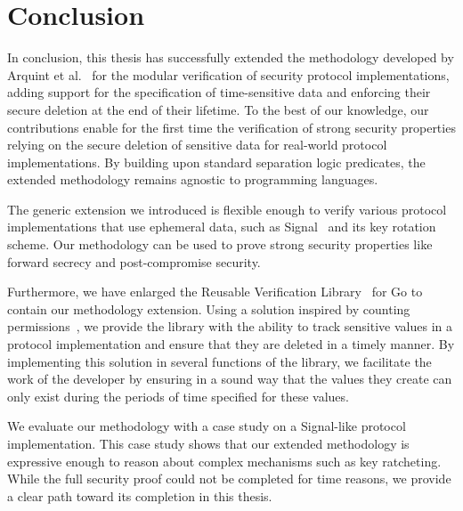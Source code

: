 \chapter{Conclusion}
\label{chap:conclusion}

In conclusion, this thesis has successfully extended the methodology developed by Arquint et al.~\cite{ArquintSchwerhoffMehtaMueller23} for the modular verification of security protocol implementations, adding support for the specification of time-sensitive data and enforcing their secure deletion at the end of their lifetime.
To the best of our knowledge, our contributions enable for the first time the verification of strong security properties relying on the secure deletion of sensitive data for real-world protocol implementations.
By building upon standard separation logic predicates, the extended methodology remains agnostic to programming languages.

The generic extension we introduced is flexible enough to verify various protocol implementations that use ephemeral data, such as Signal~\cite{marlinspike2016x3dh} and its key rotation scheme. Our methodology can be used to prove strong security properties like forward secrecy and post-compromise security.

Furthermore, we have enlarged the Reusable Verification Library~\cite{ArquintSchwerhoffMehtaMueller23} for Go to contain our methodology extension.
Using a solution inspired by counting permissions~\cite{roshardt2021extending}, we provide the library with the ability to track sensitive values in a protocol implementation and ensure that they are deleted in a timely manner.
By implementing this solution in several functions of the library, we facilitate the work of the developer by ensuring in a sound way that the values they create can only exist during the periods of time specified for these values.

We evaluate our methodology with a case study on a Signal-like protocol implementation.
This case study shows that our extended methodology is expressive enough to reason about complex mechanisms such as key ratcheting.
While the full security proof could not be completed for time reasons, we provide a clear path toward its completion in this thesis.

